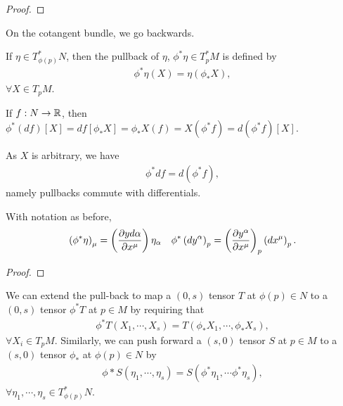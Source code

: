 \begin{proof}
    
\end{proof}

On the cotangent bundle, we go backwards.

\begin{definition}
    If $\eta \in T_{\phi \left( p \right) }^{*}N$, then the pullback of $\eta$, $\phi^{*}\eta \in T_{p}^{*} M$ is defined by
    \begin{align}
        \phi^{*}\eta \left( X \right) = \eta \left( \phi_* X \right) 
    ,\end{align}
    $\forall X \in T_{p}M$.
\end{definition}

\begin{note}
    If $f : N \to \mathbb{R}$, then $\phi^{*} \left( df \right) \left[ X \right] = d f \left[ \phi_{*} X \right] = \phi_{*} X \left( f \right) = X \left( \phi^{*} f \right) = d \left( \phi^{*} f \right) \left[ X \right]   $.

    As $X$ is arbitrary, we have
    \begin{align}
        \phi^{*} df = d \left( \phi^{*} f \right) 
    ,\end{align}
    namely pullbacks commute with differentials.
\end{note}

\begin{exercise}
    With notation as before,
    \begin{align}
        \left( \phi^{*} \eta \right)_{\mu} = \left( \pdv{yd\alpha}{x^{\mu}} \right) \eta_{\alpha} && \phi^{*}\left( dy^{\alpha} \right)_p = \left( \pdv{y^{\alpha}}{x^{\mu}} \right)_p \left( dx^{\mu} \right)_p
    .\end{align}
\end{exercise}
\begin{proof}
    
\end{proof}


We can extend the pull-back to map a $\left( 0,s \right) $ tensor $T$ at $\phi \left( p \right) \in N$ to a $\left( 0,s \right) $ tensor $\phi^{*} T$ at $p \in M$ by requiring that
\begin{align}
    \phi^{*} T \left( X_1, \cdots, X_s \right) = T \left( \phi_{*} X_1, \cdots, \phi_* X_s \right) 
,\end{align}
$\forall X_i \in T_p M$. Similarly, we can push forward a $\left( s,0 \right) $ tensor $S$ at $p \in M$ to a $\left( s,0 \right) $ tensor $\phi_*$ at $\phi \left( p \right) \in N$ by
\begin{align}
    \phi* S \left( \eta_{1},\cdots, \eta_s  \right) = S\left( \phi^{*} \eta_1, \cdots \phi^{*} \eta_s \right) 
,\end{align}
$\forall \eta_1, \cdots, \eta_{s} \in T_{\phi \left( p \right) }^{*} N$.


